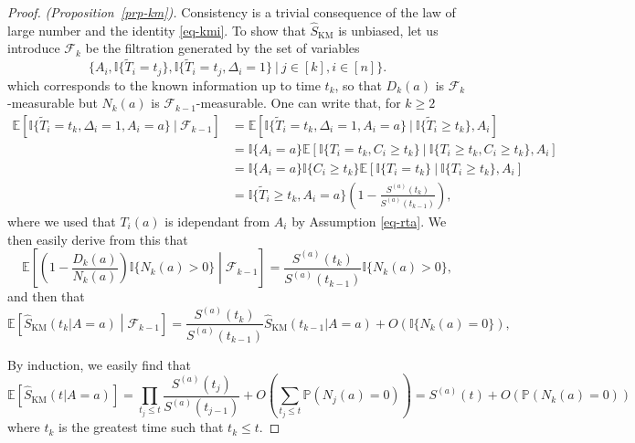 \documentclass[
  11pt,
  a4paper,
]{article}
\theoremstyle{plain}
\theoremstyle{plain}
\theoremstyle{plain}
\theoremstyle{definition}
\theoremstyle{remark}
\begin{document}
\begin{proof}
\emph{(Proposition~\ref{prp-km}).} Consistency is a trivial consequence
of the law of large number and the identity \ref{eq-kmi}. To show that
\(\widehat S_{\mathrm{KM}}\) is unbiased, let us introduce
\(\mathcal{F}_k\) be the filtration generated by the set of variables \[
\{A_i, \mathbb{I}\{\widetilde T_i = t_j\}, \mathbb{I}\{\widetilde T_i = t_j, \Delta_i=1\}~|~j \in [k], i \in [n]\}.
\] which corresponds to the known information up to time \(t_k\), so
that \(D_k(a)\) is \(\mathcal{F}_k\)-measurable but \(N_k(a)\) is
\(\mathcal{F}_{k-1}\)-measurable. One can write that, for
\(k\geqslant 2\) \begin{align*}
\mathbb{E}[\mathbb{I}\{\widetilde T_i = t_k, \Delta_i = 1, A_i=a\}~|~\mathcal{F}_{k-1}] &= \mathbb{E}[\mathbb{I}\{\widetilde T_i = t_k, \Delta_i = 1, A_i=a\}~|~\mathbb{I}\{\widetilde T_i \geqslant t_k\},A_i]  \\
&= \mathbb{I}\{A_i=a\} \mathbb{E}[\mathbb{I}\{T_i = t_k, C_i \geqslant t_k\}~|~\mathbb{I}\{T_i \geqslant t_k, C_i \geqslant t_k\}, A_i] \\
&=  \mathbb{I}\{A_i=a\} \mathbb{I}\{C_i \geqslant t_k\} \mathbb{E}[\mathbb{I}\{T_i = t_k\} ~|~ \mathbb{I}\{T_i \geqslant t_k\}, A_i] \\
&= \mathbb{I}\{\widetilde T_i \geqslant t_k, A_i=a\}\left(1- \frac{S^{(a)}(t_{k})}{S^{(a)}(t_{k-1})}\right),
\end{align*} where we used that \(T_i(a)\) is idependant from \(A_i\) by
Assumption \ref{eq-rta}. We then easily derive from this that \[
\mathbb{E}\left[\left(1-\frac{D_k(a)}{N_k(a)} \right) \mathbb{I}\{N_k(a) >0\}\middle |\mathcal{F}_{k-1}\right] = \frac{S^{(a)}(t_k)}{S^{(a)}(t_{k-1})} \mathbb{I}\{N_k(a) >0\},
\] and then that \[
\mathbb{E}\left[\widehat S_{\mathrm{KM}}(t_k|A=a)\middle |\mathcal{F}_{k-1}\right] =  \frac{S^{(a)}(t_k)}{S^{(a)}(t_{k-1})} \widehat S_{\mathrm{KM}}(t_{k-1}|A=a) + O(\mathbb{I}\{N_k(a) =0\}),
\]

By induction, we easily find that \[
\mathbb{E}[\widehat S_{\mathrm{KM}}(t|A=a)] = \prod_{t_j \leqslant t} \frac{S^{(a)}(t_j)}{S^{(a)}(t_{j-1})} + O\left(\sum_{t_j \leqslant t}\mathbb{P}(N_j(a) =0)\right)= S^{(a)}(t) + O(\mathbb{P}(N_k(a) =0))
\] where \(t_k\) is the greatest time such that \(t_k \leqslant t\).
\end{proof}
\end{document}
